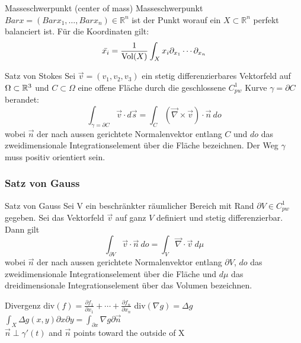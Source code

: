 \begin{Satz}{Masseschwerpunkt (center of mass)}{}
	Masseschwerpunkt $Bar{x} = (Bar{x_1}, \dots, Bar{x_n}) \in \mathbb{R}^n$ ist der Punkt worauf ein $X \subset \mathbb{R}^n$ perfekt balanciert ist. Für die Koordinaten gilt:
	\[
	\Bar{x_i} = \frac{1}{\text{Vol}(X)}\int_X x_i \partial_{x_1} \cdots \partial_{x_n}
	\]
\end{Satz}

\begin{Satz}{Satz von Stokes}{}
	Sei $\vec{v} = (v_1, v_2, v_3)$ ein stetig differenzierbares Vektorfeld auf $\Omega \subset \mathbb{R}^3$ und $C \subset \Omega$ eine offene Fläche durch die geschlossene $C^1_{pw}$ Kurve $\gamma = \partial C$ berandet:
	\[
		\int_{\gamma=\partial C} \vec{v} \cdot d\vec{s} = 
		\int_C (\vec \nabla \times \vec v) \cdot \vec n\ do
	\]
	wobei $\vec n$ der nach aussen gerichtete Normalenvektor entlang $C$ und $do$ das zweidimensionale Integrationselement über die Fläche bezeichnen. Der Weg $\gamma$ muss positiv orientiert sein.	
	
\end{Satz}

\subsubsection{Satz von Gauss}

\begin{Satz}{Satz von Gauss}{}
	Sei V ein beschränkter räumlicher Bereich mit Rand $\partial V \in C^1_{pw}$ gegeben. Sei das Vektorfeld $\vec v$ auf ganz $V$ definiert und stetig differenzierbar. Dann gilt
	\[
		\int_{\partial V} \vec v \cdot \vec n\ do = \int_V \vec \nabla \cdot \vec v\ d \mu
	\]
	wobei $\vec n$ der nach aussen gerichtete Normalenvektor entlang $\partial V$, $do$ das zweidimensionale Integrationselement über die Fläche und $d\mu$ das dreidimensionale Integrationselement über das Volumen bezeichnen.
\end{Satz}

\begin{Definition}{Divergenz}{}
$\text{div}(f) = \frac{\partial f_1}{\partial x_1} + \cdots + \frac{\partial f_n}{\partial x_n}$ \quad div$(\nabla g) = \Delta g$ \quad $\int_X \Delta g (x,y) \partial x \partial y = \int_{\partial x} \nabla g \partial \Vec{n}$\\
$\Vec{n} \perp \gamma'(t)$ and $\Vec{n}$ points toward the outside of X
\end{Definition}